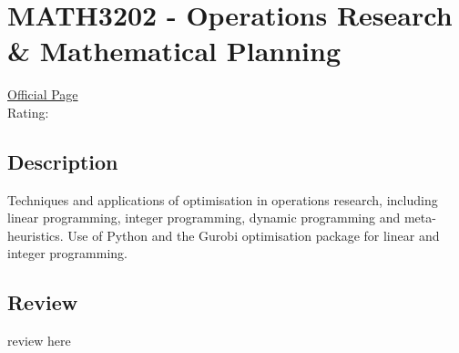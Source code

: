 \hypertarget{MATH3202}{\section{MATH3202 - Operations Research \& Mathematical Planning}}

\large
\textcolor{turbo_purple}{\href{https://my.uq.edu.au/programs-courses/course.html?course_code=MATH3202}{Official Page}} \\
Rating: \cstar\cstar\cstar\cstar\ostar

\normalsize
\subsection*{Description}
Techniques and applications of optimisation in operations research, including linear programming, integer programming, dynamic programming and meta-heuristics.
Use of Python and the Gurobi optimisation package for linear and integer programming.

\subsection*{Review}
review here
